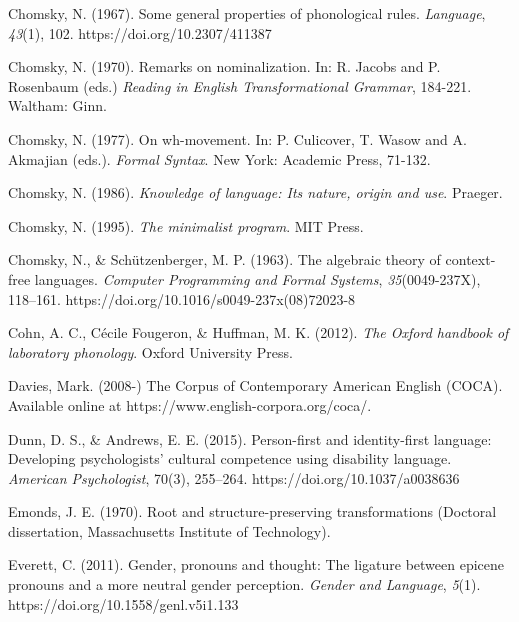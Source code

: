 \documentclass{article}
\begin{document}
\begin{thebibliography}{100}
     Chomsky, N. (1967). Some general properties of phonological rules. \textit{Language}, \textit{43}(1), 102. https://doi.org/10.2307/411387
    
    Chomsky, N. (1970). Remarks on nominalization. In: R. Jacobs and P. Rosenbaum (eds.) \textit{Reading in English Transformational Grammar}, 184-221. Waltham: Ginn.
    
    Chomsky, N. (1977). On wh-movement. In: P. Culicover, T. Wasow and A. Akmajian (eds.). \textit{Formal Syntax}. New York: Academic Press, 71-132.

    Chomsky, N. (1986). \textit{Knowledge of language: Its nature, origin and use}. Praeger.

    Chomsky, N. (1995). \textit{The minimalist program}. MIT Press.

    Chomsky, N., \& Schützenberger, M. P. (1963). The algebraic theory of context-free languages. \textit{Computer Programming and Formal Systems}, \textit{35}(0049-237X), 118–161. https://doi.org/10.1016/s0049-237x(08)72023-8
    
     Cohn, A. C., Cécile Fougeron, \& Huffman, M. K. (2012). \textit{The Oxford handbook of laboratory phonology}. Oxford University Press.
    
    Davies, Mark. (2008-) The Corpus of Contemporary American English (COCA). Available online at https://www.english-corpora.org/coca/.
    
    Dunn, D. S., \& Andrews, E. E. (2015). Person-first and identity-first language: Developing psychologists’ cultural competence using disability language. \textit{American Psychologist}, 70(3), 255–264. https://doi.org/10.1037/a0038636
    
     Emonds, J. E. (1970). Root and structure-preserving transformations (Doctoral dissertation, Massachusetts Institute of Technology).
    
     Everett, C. (2011). Gender, pronouns and thought: The ligature between epicene pronouns and a more neutral gender perception. \textit{Gender and Language}, \textit{5}(1). https://doi.org/10.1558/genl.v5i1.133
    

\end{thebibliography}
\end{document}
